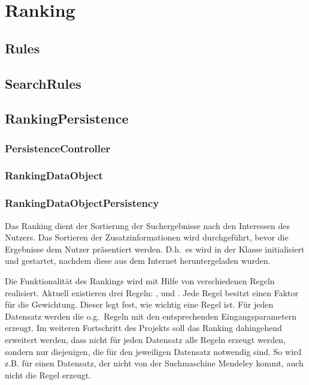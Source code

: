 
\section{Ranking}
\subsection{Rules}
\subsection{SearchRules}
\subsection{RankingPersistence}
\subsubsection{PersistenceController}
\subsubsection{RankingDataObject}
\subsubsection{RankingDataObjectPersistency}

Das Ranking dient der Sortierung der Suchergebnisse nach den Interessen des Nutzers. Das Sortieren der Zusatzinformationen wird durchgeführt, bevor die Ergebnisse dem Nutzer präsentiert werden. D.h.\ es wird in der Klasse \glqq\SearchResults\grqq\xspace initialisiert und gestartet, nachdem diese aus dem Internet heruntergeladen wurden.

Die Funktionalität des Rankings wird mit Hilfe von verschiedenen Regeln realisiert. Aktuell existieren drei Regeln: \glqq\Language\grqq\xspace, \glqq\Mendeley\grqq\xspace und \glqq\MediaType\grqq\xspace. Jede Regel besitzt einen Faktor für die Gewichtung. Dieser legt fest, wie wichtig eine Regel ist. Für jeden Datensatz werden die o.g.\ Regeln mit den entsprechenden Eingangsparametern erzeugt. Im weiteren Fortschritt des Projekts soll das Ranking dahingehend erweitert werden, dass nicht für jeden Datensatz alle Regeln erzeugt werden, sondern nur diejenigen, die für den jeweiligen Datensatz notwendig sind. So wird z.B. für einen Datensatz, der nicht von der Suchmaschine Mendeley kommt, auch nicht die Regel \glqq\Mendeley\grqq\xspace erzeugt. 

